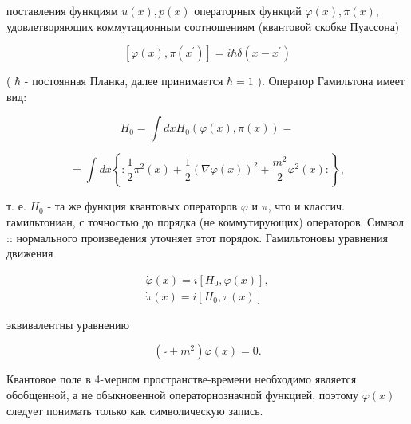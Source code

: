 \documentclass[10pt]{article}
\begin{document}
поставления функциям $u(x), p(x)$ операторных функций $\varphi(x), \pi(x)$, удовлетворяющих коммутационным соотношениям (квантовой скобке Пуассона)



\[

\left[\varphi(x), \pi\left(x^{\prime}\right)\right]=i \hbar \delta\left(x-x^{\prime}\right)

\]



( $\hbar$ - постоянная Планка, далее принимается $\hbar=1$ ). Оператор Гамильтона имеет вид:



\[

H_{0}=\int d x H_{0}(\varphi(x), \pi(x))=

\]



\[

=\int d x\left\{: \frac{1}{2} \pi^{2}(x)+\frac{1}{2}(\nabla \varphi(x))^{2}+\frac{m^{2}}{2} \varphi^{2}(x):\right\},

\]



т. е. $H_{0}$ - та же функция квантовых операторов $\varphi$ и $\pi$, что и классич. гамильтониан, с точностью до порядка (не коммутирующих) операторов. Символ :: нормального произведения уточняет этот порядок. Гамильтоновы уравнения движения



\[

\begin{gathered}

\dot{\varphi}(x)=i\left[H_{0}, \varphi(x)\right], \\

\dot{\pi}(x)=i\left[H_{0}, \pi(x)\right]

\end{gathered}

\]



эквивалентны уравнению



\[

\left(\square+m^{2}\right) \varphi(x)=0 .

\]



Квантовое поле в 4-мерном пространстве-времени необходимо является обобщенной, а не обыкновенной операторнозначной функцией, поэтому $\varphi(x)$ следует понимать только как символическую запись.
\end{document}
